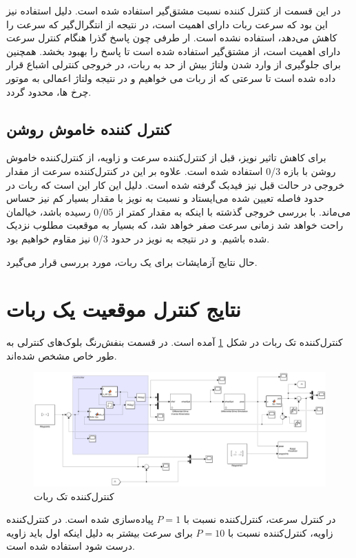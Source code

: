 در این قسمت از کنترل کننده نسبت مشتق‌گیر استفاده شده است. دلیل استفاده نیز این بود که سرعت ربات دارای اهمیت است، در نتیجه از انتگرال‌گیر که سرعت را کاهش می‌دهد، استفاده نشده است. ار طرفی چون پاسخ گذرا هنگام کنترل سرعت دارای اهمیت است، از مشتق‌گیر استفاده شده است تا پاسخ را بهبود بخشد. همچنین برای جلوگیری از وارد شدن ولتاژ بیش از حد به ربات، در خروجی کنترلی اشباع قرار داده شده است تا سرعتی که از ربات می خواهیم و در نتیجه ولتاژ اعمالی به موتور چرخ ها، محدود گردد.

\subsection{کنترل کننده خاموش روشن}
برای کاهش تاثیر نویز، قبل از کنترل‌کننده سرعت و زاویه، از کنترل‌کننده خاموش روشن با بازه 0/3 استفاده شده است. علاوه بر این در کنترل‌کننده سرعت از مقدار خروجی در حالت قبل نیز فیدبک گرفته شده است. دلیل این کار این است که ربات در حدود فاصله تعیین شده می‌ایستاد و نسبت به نویز با مقدار بسیار کم نیز حساس می‌ماند. با بررسی خروجی گذشته با اینکه به مقدار کمتر از 0/05 رسیده باشد، خیالمان راحت خواهد شد زمانی سرعت صفر خواهد شد، که بسیار به موقعبت مطلوب نزدیک شده باشیم. و در نتیجه به نویز در حدود 0/3 نیز مقاوم خواهیم بود.

حال نتایج آزمایشات برای یک ربات، مورد بررسی قرار می‌گیرد.

\section{نتایج کنترل موقعیت یک ربات}
کنترل‌کننده تک ربات در شکل \ref{Fig 1-robot-controller} آمده است. در قسمت بنفش‌رنگ بلوک‌های کنترلی به طور خاص مشخص شده‌اند.
\begin{figure}[!h] 
	\centering
 	\includegraphics[scale=0.16]{Images/1-robot controller.png}
	\caption{کنترل‌کننده تک ربات} \label{Fig 1-robot-controller}
\end{figure}
 
 در کنترل سرعت، کنترل‌کننده نسبت با $P=1$ پیاده‌سازی شده است. در کنترل‌کننده زاویه، کنترل‌کننده نسبت با $P=10$ برای سرعت بیشتر به دلیل اینکه اول باید زاویه درست شود استفاده شده است.
 
